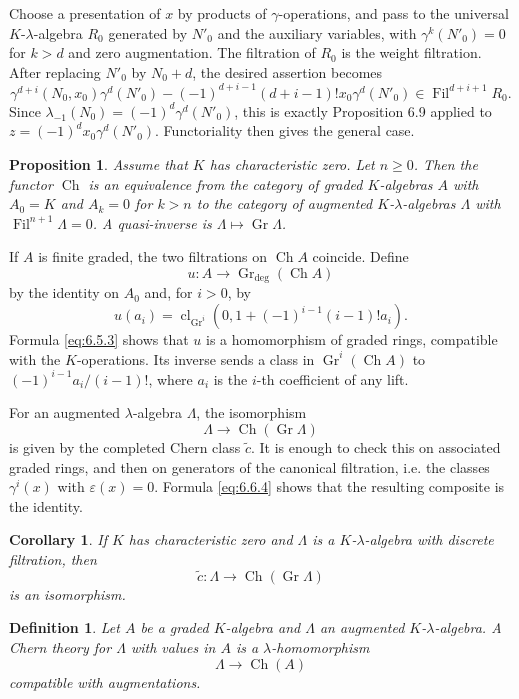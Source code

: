 \documentclass[13pt]{extarticle}
\newcommand{\Fil}{\operatorname{Fil}}
\newcommand{\Gr}{\operatorname{Gr}}
\newcommand{\cl}{\operatorname{cl}}
\newcommand{\Ch}{\operatorname{Ch}}
\newtheorem*{proposition}{Proposition}
\newtheorem*{corollary}{Corollary}
\newtheorem*{definition}{Definition}
\begin{document}
Choose a presentation of $x$ by products of $\gamma$-operations, and pass to the universal $K$-$\lambda$-algebra $R_0$ generated by $N'_0$ and the auxiliary variables, with $\gamma^k(N'_0)=0$ for $k>d$ and zero augmentation. The filtration of $R_0$ is the weight filtration. After replacing $N'_0$ by $N_0+d$, the desired assertion becomes
\[
\gamma^{d+i}(N_0,x_0)\gamma^d(N'_0)-(-1)^{d+i-1}(d+i-1)!x_0\gamma^d(N'_0)\in\Fil^{d+i+1}R_0.
\]
Since $\lambda_{-1}(N_0)=(-1)^d\gamma^d(N'_0)$, this is exactly Proposition 6.9 applied to $z=(-1)^dx_0\gamma^d(N'_0)$. Functoriality then gives the general case.

\begin{proposition}\label{prop:6.11}
Assume that $K$ has characteristic zero. Let $n\geq 0$. Then the functor $\Ch$ is an equivalence from the category of graded $K$-algebras $A$ with $A_0=K$ and $A_k=0$ for $k>n$ to the category of augmented $K$-$\lambda$-algebras $\Lambda$ with $\Fil^{n+1}\Lambda=0$. A quasi-inverse is $\Lambda\mapsto\Gr\Lambda$.
\end{proposition}

If $A$ is finite graded, the two filtrations on $\Ch A$ coincide. Define
\[
u:A\longrightarrow\Gr_{\deg}(\Ch A)
\]
by the identity on $A_0$ and, for $i>0$, by
\[
u(a_i)=\cl_{\Gr^i}(0,1+(-1)^{i-1}(i-1)!a_i).
\]
Formula \eqref{eq:6.5.3} shows that $u$ is a homomorphism of graded rings, compatible with the $K$-operations. Its inverse sends a class in $\Gr^i(\Ch A)$ to $(-1)^{i-1}a_i/(i-1)!$, where $a_i$ is the $i$-th coefficient of any lift.

For an augmented $\lambda$-algebra $\Lambda$, the isomorphism
\[
\Lambda\longrightarrow\Ch(\Gr\Lambda)
\]
is given by the completed Chern class $\widetilde c$. It is enough to check this on associated graded rings, and then on generators of the canonical filtration, i.e. the classes $\gamma^i(x)$ with $\varepsilon(x)=0$. Formula \eqref{eq:6.6.4} shows that the resulting composite is the identity.

\begin{corollary}\label{cor:6.12}
If $K$ has characteristic zero and $\Lambda$ is a $K$-$\lambda$-algebra with discrete filtration, then
\[
\widetilde c:\Lambda\longrightarrow\Ch(\Gr\Lambda)
\]
is an isomorphism.
\end{corollary}

\begin{definition}\label{def:6.13}
Let $A$ be a graded $K$-algebra and $\Lambda$ an augmented $K$-$\lambda$-algebra. A \emph{Chern theory for $\Lambda$ with values in $A$} is a $\lambda$-homomorphism
\[
\Lambda\longrightarrow\Ch(A)
\]
compatible with augmentations.
\end{definition}
\end{document}

